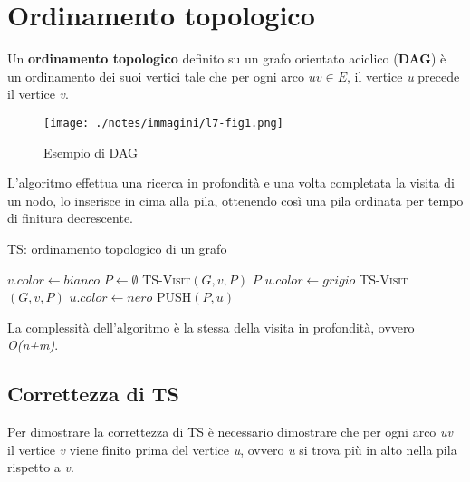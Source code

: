 \section{Ordinamento topologico}\label{ordinamento-topologico}

Un \textbf{ordinamento topologico} definito su un grafo orientato
aciclico (\textbf{DAG}) è un ordinamento dei suoi vertici tale che per
ogni arco $uv \in E$, il vertice \emph{u} precede il vertice
\emph{v}.

\begin{figure}[htbp]
\centering
\texttt{[image: ./notes/immagini/l7-fig1.png]}
\caption{Esempio di DAG}
\end{figure}

L'algoritmo effettua una ricerca in profondità e una volta completata la
visita di un nodo, lo inserisce in cima alla pila, ottenendo così una
pila ordinata per tempo di finitura decrescente.

\begin{breakablealgorithm}
	\caption{TS: ordinamento topologico di un grafo}
	\begin{algorithmic}[1]
				\State $ v.color \gets bianco $
			\EndFor
			\State $ P \gets \emptyset $
					\State \textsc{TS-Visit}$ (G,v,P) $
				\EndIf
			\EndFor
			\State \Return $ P $
		\EndFunction
		\Statex
			\State $ u.color \gets grigio $
					\State \textsc{TS-Visit}$ (G,v,P) $
				\EndIf
			\EndFor
			\State $ u.color \gets nero $
			\State \textsc{PUSH}$ (P,u) $
		\EndFunction
	\end{algorithmic}
\end{breakablealgorithm}

La complessità dell'algoritmo è la stessa della visita in profondità,
ovvero \emph{O(n+m)}.

\subsection{Correttezza di TS}\label{correttezza-di-ts}

Per dimostrare la correttezza di \textsc{TS} è necessario dimostrare che
per ogni arco \emph{uv} il vertice \emph{v} viene finito prima del
vertice \emph{u}, ovvero \emph{u} si trova più in alto nella pila
rispetto a \emph{v}.

